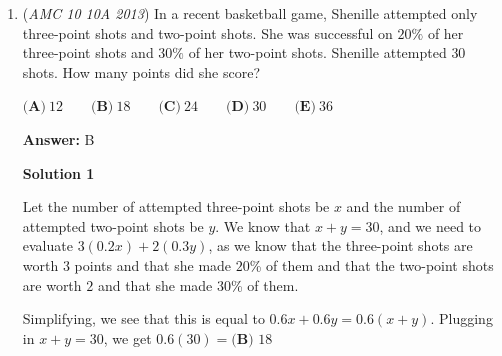 \begin{enumerate}
 So all we need to prove is that $\operatorname{gcd}(2^{2014}+2^{2012}, 2^{2014}-2^{2012}) \neq 2^{2014}+2^{2012} \text{ or } 2^{2014}-2^{2012}$. Since the numerator is larger than the denominator, the only possible case is $\gcd(2^{2014}+2^{2012}, 2^{2014}-2^{2012}) = 2^{2014}-2^{2012}$. We have to prove that this is impossible. Using the Euclidean Algorithm we can simplify to obtain\begin{align*}\gcd(2^{2014}+2^{2012}, 2^{2014}-2^{2012}) &= \gcd(2^{2014}+2^{2012}-2^{2014}+2^{2012}, 2^{2014}-2^{2012})\\&= \gcd(2 \cdot 2^{2012}, 2^{2014}-2^{2012})\\&= \gcd(2^{2013}, 2^{2014}-2^{2012})\end{align*}
We notice that $2^{2014}-2^{2012}$ can be factored since $2^{2012}$ is a common factor. Factoring gives us $2^{2014}-2^{2012} = 2^{2012}(2^2-1) = 3 \cdot 2^{2012}$. From this we know that $3$ is a factor of the original expression. Hence $\gcd(2^{2013}, 2^{2014}-2^{2012}) = \gcd(2^{2013}, 3 \cdot 2^{2012}) = 2^{2013} \neq 2^{2012} \cdot 3$. So $2^{2014}-2^{2012} \nmid 2^{2014}+2^{2012}$. So the fraction cannot be simplified into an integer. Hence the answer is the only fraction, $\boxed{\textbf{(C)}}$.

 


	\item (\textit{AMC 10 10A 2013}) In a recent basketball game, Shenille attempted only three-point shots and two-point shots.  She was successful on $20\%$ of her three-point shots and $30\%$ of her two-point shots.  Shenille attempted $30$ shots.  How many points did she score?


 $\textbf{(A)}\ 12 \qquad\textbf{(B)}\ 18  \qquad\textbf{(C)}\ 24 \qquad\textbf{(D)}\ 30 \qquad\textbf{(E)}\ 36$

 \textbf{Answer: }B



\textbf{Solution 1}

Let the number of attempted three-point shots be $x$ and the number of attempted two-point shots be $y$.  We know that $x+y=30$, and we need to evaluate $3(0.2x) + 2(0.3y)$, as we know that the three-point shots are worth $3$ points and that she made $20$\% of them and that the two-point shots are worth $2$ and that she made $30$\% of them.

 Simplifying, we see that this is equal to $0.6x + 0.6y = 0.6(x+y)$.  Plugging in $x+y=30$, we get $0.6(30) = \boxed{\textbf{(B) }18}$





\end{enumerate}
